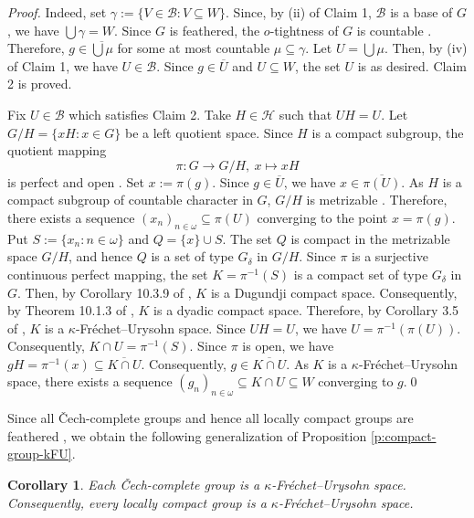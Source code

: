 \documentclass[preprint,11pt]{elsarticle}
\newtheorem{corollary}[theorem]{Corollary}
\numberwithin{equation}{section}
\numberwithin{theorem}{section}
\newcommand{\w}{\omega}
\begin{document}
\begin{proof}
Indeed, set $\gamma:=\{V\in\mathcal{B}:V\subseteq W\}$. Since, by (ii) of Claim 1,  $\mathcal{B}$ is a base of $G$, we have $\bigcup \gamma=W$.
Since $G$ is feathered, the $o$-tightness of $G$ is countable \cite[Corollary 5.5.7]{ArT}. Therefore, $g\in \overline{\bigcup\mu}$ for some at most countable $\mu\subseteq\gamma$. Let $U=\bigcup\mu$. Then, by (iv) of Claim 1, we have $U\in \mathcal{B}$. Since  $g\in \overline{U}$ and $U\subseteq W$, the set $U$ is as desired. Claim 2 is proved.
\smallskip

Fix $U\in\mathcal{B}$ which satisfies Claim 2. Take $H\in\mathcal{H}$ such that $UH=U$. Let $G/H=\{xH:x\in G\}$ be a left quotient space.
Since $H$ is a compact subgroup, the quotient mapping
\[
\pi: G\to G/H,\ x\mapsto xH
\]
is perfect \cite[Theorem 1.5.7]{ArT} and open \cite[Theorem 1.5.1]{ArT}. Set $x:=\pi(g)$. Since $g\in \overline{U}$, we have $x\in \overline{\pi(U)}$. As $H$ is a compact subgroup of countable character in $G$, $G/H$ is metrizable \cite[Lemma 4.3.19]{ArT}. Therefore, there exists a sequence $(x_n)_{n\in\w}\subseteq \pi(U)$ converging to the point $x=\pi(g)$. Put $S:=\{x_n:n\in\w\}$ and $Q=\{x\}\cup S$. The set $Q$ is compact in the metrizable space $G/H$, and hence $Q$ is a set of type $G_\delta$ in $G/H$. Since $\pi$ is a surjective continuous perfect mapping, the set $K=\pi^{-1}(S)$ is a compact set of type $G_\delta$ in $G$. Then, by Corollary 10.3.9 of  \cite{ArT},  $K$ is a Dugundji compact space. Consequently, by Theorem 10.1.3 of  \cite{ArT}, $K$ is a dyadic compact space.
Therefore, by Corollary 3.5 of \cite{LiL}, $K$ is a $\kappa$-Fr\'{e}chet--Urysohn space. Since $UH=U$, we have $U=\pi^{-1}(\pi(U))$. Consequently, $K\cap U=\pi^{-1}(S)$. Since $\pi$ is open, we have $gH=\pi^{-1}(x)\subseteq \overline{K\cap U}$. Consequently, $g\in \overline{K\cap U}$. As $K$ is a $\kappa$-Fr\'{e}chet--Urysohn space, there exists a sequence $(g_n)_{n\in\w} \subseteq K\cap U \subseteq W$ converging to $g$.\qed
\end{proof}

Since all \v{C}ech-complete groups and hence all locally compact groups are feathered \cite[4.3]{ArT}, we obtain the following generalization of Proposition \ref{p:compact-group-kFU}.


\begin{corollary} \label{c:lcg-kFU}
Each \v{C}ech-complete group is a $\kappa$-Fr\'{e}chet--Urysohn space. Consequently, every locally compact group is a $\kappa$-Fr\'{e}chet--Urysohn space.
\end{corollary}
\end{document}
